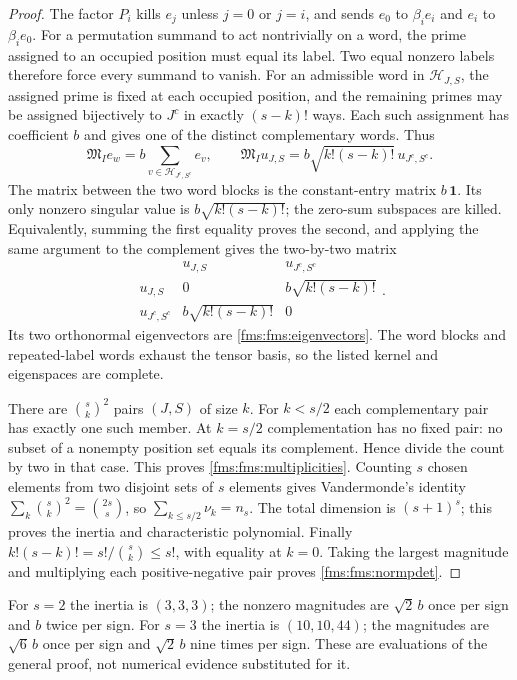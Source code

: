 \begin{proof}
The factor $P_i$ kills $e_j$ unless $j=0$ or $j=i$,
and sends $e_0$ to $\beta_i e_i$ and $e_i$ to $\beta_i e_0$.
For a permutation summand to act nontrivially on a word, the prime
assigned to an occupied position must equal its label.
Two equal nonzero labels therefore force every summand to vanish.
For an admissible word in $\mathcal H_{J,S}$, the assigned prime
is fixed at each occupied position, and the remaining primes may
be assigned bijectively to $J^c$ in exactly $(s-k)!$ ways.
Each such assignment has coefficient $b$ and gives one of the
distinct complementary words. Thus
\begin{equation}\tag{FMS29}\label{fms:fms:blockmap}
 \mathfrak M_I e_w=
 b\sum_{v\in\mathcal H_{J^c,S^c}}e_v,\qquad
 \mathfrak M_Iu_{J,S}
       =b\sqrt{k!(s-k)!}\,u_{J^c,S^c}.
\end{equation}
The matrix between the two word blocks is the constant-entry
matrix $b\,\mathbf1$. Its only nonzero singular value is
$b\sqrt{k!(s-k)!}$; the zero-sum subspaces are killed.
Equivalently, summing the first equality proves the second,
and applying the same argument to the complement gives the
two-by-two matrix
\[
 \begin{array}{c|cc}
 &u_{J,S}&u_{J^c,S^c}\\ \hline
 u_{J,S}&0&b\sqrt{k!(s-k)!}\\
 u_{J^c,S^c}&b\sqrt{k!(s-k)!}&0
 \end{array}.
\]
Its two orthonormal eigenvectors are \eqref{fms:fms:eigenvectors}.
The word blocks and repeated-label words exhaust the tensor
basis, so the listed kernel and eigenspaces are complete.

There are $\binom{s}{k}^2$ pairs $(J,S)$ of size $k$.
For $k<s/2$ each complementary pair has exactly one such member.
At $k=s/2$ complementation has no fixed pair: no subset of a
nonempty position set equals its complement. Hence divide the
count by two in that case. This proves \eqref{fms:fms:multiplicities}.
Counting $s$ chosen elements from two disjoint sets of $s$
elements gives Vandermonde's identity
$\sum_k\binom{s}{k}^2=\binom{2s}{s}$, so
$\sum_{k\le s/2}\nu_k=n_s$.
The total dimension is $(s+1)^s$; this proves the inertia and
characteristic polynomial. Finally
$k!(s-k)!=s!/\binom{s}{k}\le s!$, with equality at $k=0$.
Taking the largest magnitude and multiplying each positive-negative
pair proves \eqref{fms:fms:normpdet}.
\end{proof}

For $s=2$ the inertia is $(3,3,3)$; the nonzero magnitudes
are $\sqrt2\,b$ once per sign and $b$ twice per sign.
For $s=3$ the inertia is $(10,10,44)$; the magnitudes are
$\sqrt6\,b$ once per sign and $\sqrt2\,b$ nine times per sign.
These are evaluations of the general proof, not numerical evidence
substituted for it.

